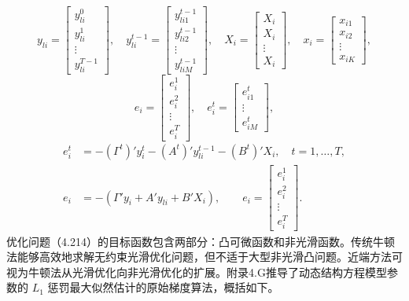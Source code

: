 \[
y_{li}=\begin{bmatrix}y_{li}^0\\y_{li}^1\\\vdots\\y_{li}^{T-1}\end{bmatrix},\quad
y_{li}^{t-1}=\begin{bmatrix}y_{li1}^{t-1}\\y_{li2}^{t-1}\\\vdots\\y_{liM}^{t-1}\end{bmatrix},\quad
X_i=\begin{bmatrix}X_i\\X_i\\\vdots\\X_i\end{bmatrix},\quad
x_i=\begin{bmatrix}x_{i1}\\x_{i2}\\\vdots\\x_{iK}\end{bmatrix},
\]
\[
e_i=\begin{bmatrix}e_i^1\\e_i^2\\\vdots\\e_i^T\end{bmatrix},\quad
e_i^t=\begin{bmatrix}e_{i1}^t\\\vdots\\e_{iM}^t\end{bmatrix},
\]
\[
\begin{aligned}
e_i^t&=-(\Gamma^t)'y_i^t-(A^t)'y_{li}^{t-1}-(B^t)'X_i,
\quad t=1,\ldots,T,\\
e_i&=-(\Gamma'y_i+A'y_{li}+B'X_i),\qquad
e_i=\begin{bmatrix}e_i^1\\e_i^2\\\vdots\\e_i^T\end{bmatrix}.
\end{aligned}
\]
优化问题（4.214）的目标函数包含两部分：凸可微函数和非光滑函数。传统牛顿法能够高效地求解无约束光滑优化问题，但不适于大型非光滑凸问题。近端方法可视为牛顿法从光滑优化向非光滑优化的扩展。附录4.G推导了动态结构方程模型参数的 $L_1$ 惩罚最大似然估计的原始梯度算法，概括如下。

